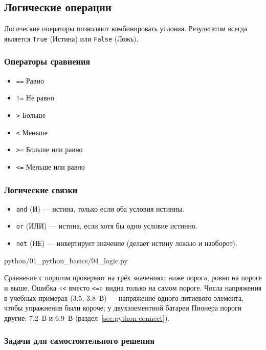 \subsection{Логические операции}

Логические операторы позволяют комбинировать условия. Результатом всегда является \texttt{True} (Истина) или \texttt{False} (Ложь).

\subsubsection*{Операторы сравнения}
\begin{itemize}
    \item \texttt{==} Равно
    \item \texttt{!=} Не равно
    \item \texttt{>} Больше
    \item \texttt{<} Меньше
    \item \texttt{>=} Больше или равно
    \item \texttt{<=} Меньше или равно
\end{itemize}

\subsubsection*{Логические связки}
\begin{itemize}
    \item \texttt{and} (И) — истина, только если оба условия истинны.
    \item \texttt{or} (ИЛИ) — истина, если хотя бы одно условие истинно.
    \item \texttt{not} (НЕ) — инвертирует значение (делает истину ложью и наоборот).
\end{itemize}

\begin{codefile}[python]{python/01_python_basics/04_logic.py}
\end{codefile}

Сравнение с порогом проверяют на трёх значениях: ниже порога, ровно на пороге и выше. Ошибка «\texttt{<} вместо \texttt{<=}» видна только на самом пороге. Числа напряжения в учебных примерах (3.5, 3.8~В) --- напряжение одного литиевого элемента, чтобы упражнения были короче; у двухэлементной батареи Пионера пороги другие: 7.2~В и 6.9~В (раздел~\ref{sec:python-connect}).

\subsubsection*{Задачи для самостоятельного решения}

